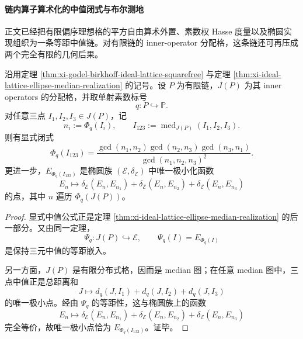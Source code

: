 \paragraph{链内算子算术化的中值闭式与布尔测地}
正文已经把有限偏序理想格的平方自由算术外置、素数权 Hasse 度量以及椭圆实现组织为一条等距中值链。对有限链的 inner-operator 分配格，这条链还可再压成两个完全有限的几何后果。

\begin{theorem}[链内算子算术中值的唯一极小性]\label{thm:derived-chain-arithmetic-median-unique-minimizer}
沿用定理 \ref{thm:xi-godel-birkhoff-ideal-lattice-squarefree} 与定理 \ref{thm:xi-ideal-lattice-ellipse-median-realization} 的记号。设 \(P\) 为有限链，\(J(P)\) 为其 inner operators 的分配格，并取单射素数标号
\[
q:P\hookrightarrow \mathbb P.
\]
对任意三点 \(I_1,I_2,I_3\in J(P)\)，记
\[
n_i:=\Phi_q(I_i),
\qquad
I_{123}:=\operatorname{med}_{J(P)}(I_1,I_2,I_3).
\]
则有显式闭式
\[
\Phi_q(I_{123})
=
\frac{\gcd(n_1,n_2)\gcd(n_2,n_3)\gcd(n_3,n_1)}
{\gcd(n_1,n_2,n_3)^2}.
\]
更进一步，\(E_{\Phi_q(I_{123})}\) 是椭圆族 \((\mathcal E,\delta_{\mathcal E})\) 中唯一极小化函数
\[
E_n\longmapsto
\delta_{\mathcal E}(E_n,E_{n_1})
+\delta_{\mathcal E}(E_n,E_{n_2})
+\delta_{\mathcal E}(E_n,E_{n_3})
\]
的点，其中 \(n\) 遍历 \(\Phi_q(J(P))\)。
\end{theorem}
\begin{proof}
显式中值公式正是定理 \ref{thm:xi-ideal-lattice-ellipse-median-realization} 的后一部分。又由同一定理，
\[
\Psi_q:J(P)\hookrightarrow \mathcal E,
\qquad
\Psi_q(I)=E_{\Phi_q(I)}
\]
是保持三元中值的等距嵌入。

另一方面，\(J(P)\) 是有限分布式格，因而是 median 图；在任意 median 图中，三点中值正是总距离和
\[
J\longmapsto d_q(J,I_1)+d_q(J,I_2)+d_q(J,I_3)
\]
的唯一极小点。经由 \(\Psi_q\) 的等距性，这与椭圆族上的函数
\[
E_n\longmapsto
\delta_{\mathcal E}(E_n,E_{n_1})
+\delta_{\mathcal E}(E_n,E_{n_2})
+\delta_{\mathcal E}(E_n,E_{n_3})
\]
完全等价，故唯一极小点恰为 \(E_{\Phi_q(I_{123})}\)。证毕。
\end{proof}

